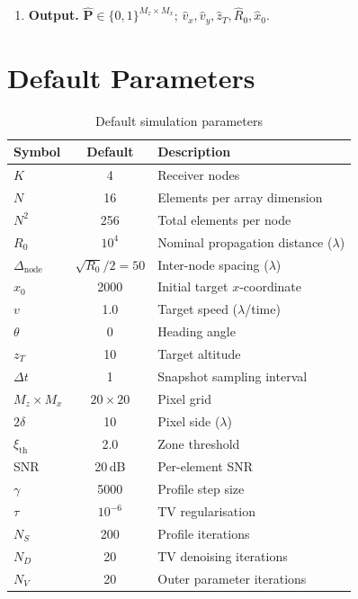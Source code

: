 \documentclass[11pt,a4paper]{article}
\begin{document}
\begin{enumerate}
  \item \textbf{Output.}
    $\hat{\mathbf{P}}\in\{0,1\}^{M_z\times M_x}$;\;
    $\hat{v}_x,\hat{v}_y,\hat{z}_T,\hat{R}_0,\hat{x}_0$.
\end{enumerate}

\section{Default Parameters}
\label{sec:params}

\begin{table}[H]
\centering
\caption{Default simulation parameters}
\label{tab:params}
\begin{tabular}{@{}lcl@{}}
\toprule
\textbf{Symbol} & \textbf{Default} & \textbf{Description} \\
\midrule
$K$ & 4 & Receiver nodes \\
$N$ & 16 & Elements per array dimension \\
$N^2$ & 256 & Total elements per node \\
$R_0$ & $10^4$ & Nominal propagation distance ($\lambda$) \\
$\Delta_{\mathrm{node}}$ & $\sqrt{R_0}/2=50$ & Inter-node spacing ($\lambda$) \\
$x_0$ & 2000 & Initial target $x$-coordinate \\
$v$ & 1.0 & Target speed ($\lambda$/time) \\
$\theta$ & 0 & Heading angle \\
$z_T$ & 10 & Target altitude \\
$\Delta t$ & 1 & Snapshot sampling interval \\
$M_z{\times}M_x$ & $20{\times}20$ & Pixel grid \\
$2\delta$ & 10 & Pixel side ($\lambda$) \\
$\xi_{\mathrm{th}}$ & 2.0 & Zone threshold \\
SNR & 20\,dB & Per-element SNR \\
\midrule
$\gamma$ & 5000 & Profile step size \\
$\tau$ & $10^{-6}$ & TV regularisation \\
$N_S$ & 200 & Profile iterations \\
$N_D$ & 20 & TV denoising iterations \\
$N_V$ & 20 & Outer parameter iterations \\
\bottomrule
\end{tabular}
\end{table}
\end{document}
